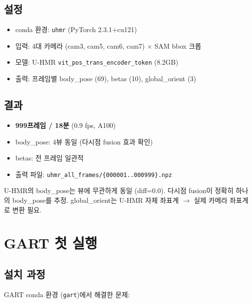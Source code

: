 \documentclass[11pt, a4paper]{report}
\begin{document}
\section{설정}
\begin{itemize}[leftmargin=*]
  \item conda 환경: \texttt{uhmr} (PyTorch 2.3.1+cu121)
  \item 입력: 4대 카메라 (cam3, cam5, cam6, cam7) $\times$ SAM bbox 크롭
  \item 모델: U-HMR \texttt{vit\_pos\_trans\_encoder\_token} (8.2GB)
  \item 출력: 프레임별 body\_pose (69), betas (10), global\_orient (3)
\end{itemize}

\section{결과}
\begin{itemize}[leftmargin=*]
  \item \textbf{999프레임 / 18분} (0.9 fps, A100)
  \item body\_pose: 4뷰 동일 (다시점 fusion 효과 확인)
  \item betas: 전 프레임 일관적
  \item 출력 파일: \texttt{uhmr\_all\_frames/\{000001..000999\}.npz}
\end{itemize}

\begin{keyidea}
U-HMR의 body\_pose는 뷰에 무관하게 동일 (diff=0.0). 다시점 fusion이 정확히 하나의 body\_pose를 추정.
global\_orient는 U-HMR 자체 좌표계 $\rightarrow$ 실제 카메라 좌표계로 변환 필요.
\end{keyidea}


\chapter{GART 첫 실행}

\section{설치 과정}

GART conda 환경 (\texttt{gart})에서 해결한 문제:
\end{document}
